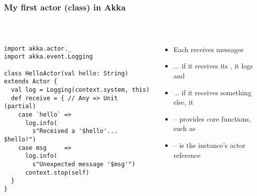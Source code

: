 \documentclass[aspectratio=169]{beamer}
\begin{document}
\begin{frame}[fragile]\frametitle{My first actor (class) in Akka}
~\\[-8mm]
\begin{columns}
\begin{column}{0.56\textwidth}
\begin{lstlisting}[emph={Actor, Logging, receive, system,stop}]
import akka.actor._
import akka.event.Logging

class HelloActor(val hello: String) extends Actor {
  val log = Logging(context.system, this)
  def receive = { // Any => Unit (partial)
    case `hello` =>
      log.info(
        s"Received a '$hello'... $hello!")
    case msg     =>
      log.info(
        s"Unexpected message '$msg'")
      context.stop(self)
  }
}
\end{lstlisting}
\end{column}
\begin{column}{0.44\textwidth}
\begin{itemize}
  \item Each  receives messages
  \item ... if it receives its , it logs and 
  \item ... if it receives something else, it 
  \item {} -- provides core functions, such as 
  \item {} -- is the instance's actor reference
\end{itemize}
\end{column}
\end{columns}
\end{frame}
\end{document}
